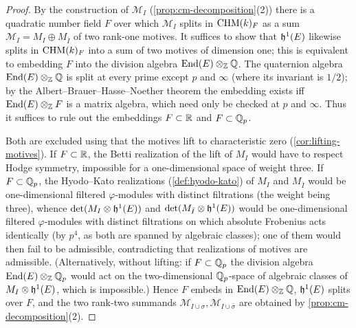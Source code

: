 \begin{proof}
  By the construction of \(\mathcal{M}_I\) (\cref{prop:cm-decomposition}(2)) there
  is a quadratic number field \(F\) over which \(\mathcal{M}_I\) splits in
  \(\mathrm{CHM}(k)_{F}\) as a sum \(\mathcal{M}_I = M_I \oplus M_{\bar I}\) of two
  rank-one motives. It suffices to show that \(\mathfrak{h}^1(E)\) likewise splits in
  \(\mathrm{CHM}(k)_{F}\) into a sum of two motives of dimension one; this is equivalent
  to embedding \(F\) into the division algebra \(\mathrm{End}(E) \otimes_{\mathbb{Z}} \mathbb{Q}\). The
  quaternion algebra \(\mathrm{End}(E) \otimes_{\mathbb{Z}} \mathbb{Q}\) is split at every prime except
  \(p\) and \(\infty\) (where its invariant is \(1/2\)); by the
  Albert--Brauer--Hasse--Noether theorem the embedding exists iff
  \(\mathrm{End}(E) \otimes_{\mathbb{Z}} F\) is a matrix algebra, which need only be checked at
  \(p\) and \(\infty\). Thus it suffices to rule out the embeddings
  \(F \subset \mathbb{R}\) and \(F \subset \mathbb{Q}_p\).

  Both are excluded using that the motives lift to characteristic zero
  (\cref{cor:lifting-motives}). If \(F \subset \mathbb{R}\), the Betti realization of the
  lift of \(M_I\) would have to respect Hodge symmetry, impossible for a
  one-dimensional space of weight three. If \(F \subset \mathbb{Q}_p\), the Hyodo--Kato
  realizations (\cref{def:hyodo-kato}) of \(M_I\) and \(M_{\bar I}\) would be
  one-dimensional filtered \(\varphi\)-modules with distinct filtrations (the
  weight being three), whence \(\det(M_I \otimes \mathfrak{h}^1(E))\) and
  \(\det(M_{\bar I} \otimes \mathfrak{h}^1(E))\) would be one-dimensional filtered
  \(\varphi\)-modules with distinct filtrations on which absolute Frobenius acts
  identically (by \(p^4\), as both are spanned by algebraic classes); one of them
  would then fail to be admissible, contradicting that realizations of motives
  are admissible. (Alternatively, without lifting: if \(F \subset \mathbb{Q}_p\) the
  division algebra \(\mathrm{End}(E) \otimes_{\mathbb{Z}} \mathbb{Q}_p\) would act on the two-dimensional
  \(\mathbb{Q}_p\)-space of algebraic classes of \(M_I \otimes \mathfrak{h}^1(E)\), which is
  impossible.) Hence \(F\) embeds in \(\mathrm{End}(E) \otimes_{\mathbb{Z}} \mathbb{Q}\), \(\mathfrak{h}^1(E)\)
  splits over \(F\), and the two rank-two summands
  \(\mathcal{M}_{I \cup \sigma}, \mathcal{M}_{I \cup \bar\sigma}\) are obtained by
  \cref{prop:cm-decomposition}(2).
\end{proof}

